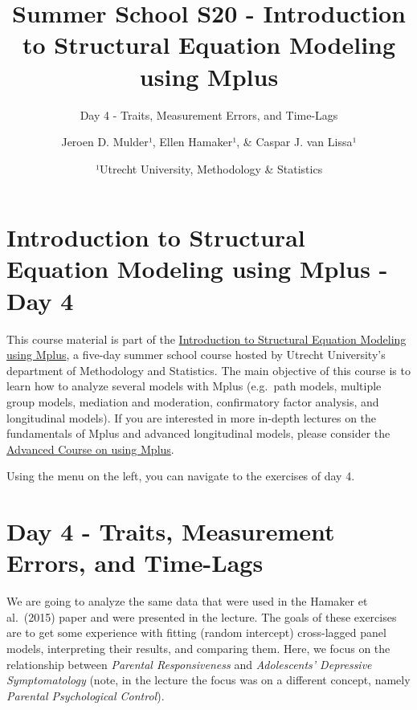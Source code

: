 \documentclass[
]{book}
\title{Summer School S20 - Introduction to Structural Equation Modeling using Mplus}
\subtitle{Day 4 - Traits, Measurement Errors, and Time-Lags}
\author{Jeroen D. Mulder¹, Ellen Hamaker¹, \& Caspar J. van Lissa¹}
\date{¹Utrecht University, Methodology \& Statistics}
\begin{document}
\maketitle

{
\setcounter{tocdepth}{1}
\tableofcontents
}
\hypertarget{introduction-to-structural-equation-modeling-using-mplus---day-4}{%
\chapter*{Introduction to Structural Equation Modeling using Mplus - Day 4}\label{introduction-to-structural-equation-modeling-using-mplus---day-4}}

This course material is part of the \href{https://utrechtsummerschool.nl/courses/social-sciences/introduction-to-structural-equation-modeling-using-mplus}{Introduction to Structural Equation Modeling using Mplus}, a five-day summer school course hosted by Utrecht University's department of Methodology and Statistics. The main objective of this course is to learn how to analyze several models with Mplus (e.g.~path models, multiple group models, mediation and moderation, confirmatory factor analysis, and longitudinal models). If you are interested in more in-depth lectures on the fundamentals of Mplus and advanced longitudinal models, please consider the \href{https://utrechtsummerschool.nl/courses/social-sciences/advanced-course-on-using-mplus}{Advanced Course on using Mplus}.

Using the menu on the left, you can navigate to the exercises of day 4.

\hypertarget{day-4---traits-measurement-errors-and-time-lags}{%
\chapter{Day 4 - Traits, Measurement Errors, and Time-Lags}\label{day-4---traits-measurement-errors-and-time-lags}}

We are going to analyze the same data that were used in the Hamaker et al.~(2015) paper and were presented in the lecture. The goals of these exercises are to get some experience with fitting (random intercept) cross-lagged panel models, interpreting their results, and comparing them. Here, we focus on the relationship between \emph{Parental Responsiveness} and \emph{Adolescents' Depressive Symptomatology} (note, in the lecture the focus was on a different concept, namely \emph{Parental Psychological Control}).
\end{document}
